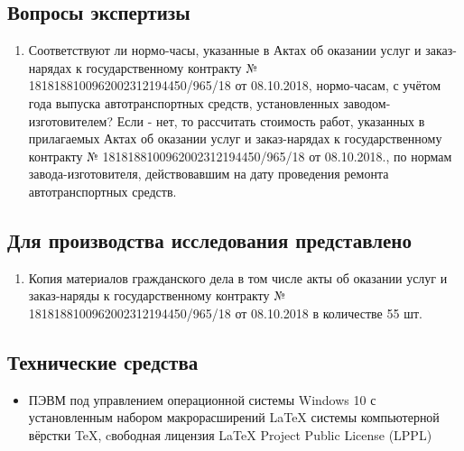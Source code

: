 \setcounter{page}{1}

%

%
\subsection{Вопросы экспертизы}

\begin{enumerate}
	\item Соответствуют ли нормо-часы, указанные в Актах об оказании услуг и заказ-нарядах к государственному контракту № 1818188100962002312194450/965/18 от 08.10.2018, нормо-часам, с учётом года выпуска автотранспортных средств, установленных заводом-изготовителем? Если - нет, то рассчитать стоимость работ, указанных в прилагаемых Актах об оказании услуг и заказ-нарядах к государственному контракту  № 1818188100962002312194450/965/18 от 08.10.2018., по нормам завода-изготовителя, действовавшим на дату проведения ремонта автотранспортных средств.
\end{enumerate}


\subsection{Для производства исследования представлено} %
\begin{enumerate}
	\item Копия материалов гражданского дела в том числе акты об оказании услуг и заказ-наряды к государственному контракту  № 1818188100962002312194450/965/18 от 08.10.2018  в количестве 55 шт. 
	\end{enumerate}
%
%
%


\subsection{Технические средства}  %
\begin{itemize}

%

\item  ПЭВМ под управлением операционной системы Windows 10 с установленным набором макрорасширений LaTeX системы компьютерной вёрстки TeX, cвободная лицензия LaTeX Project Public License (LPPL)
%	
\end{itemize}
